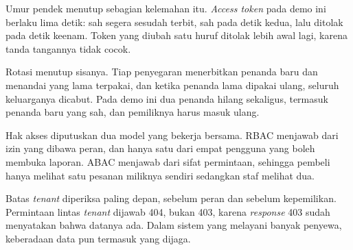 Umur pendek menutup sebagian kelemahan itu. \textit{Access token} pada demo
ini berlaku lima detik: sah segera sesudah terbit, sah pada detik kedua,
lalu ditolak pada detik keenam. Token yang diubah satu huruf ditolak lebih
awal lagi, karena tanda tangannya tidak cocok.

Rotasi menutup sisanya. Tiap penyegaran menerbitkan penanda baru dan
menandai yang lama terpakai, dan ketika penanda lama dipakai ulang, seluruh
keluarganya dicabut. Pada demo ini dua penanda hilang sekaligus, termasuk
penanda baru yang sah, dan pemiliknya harus masuk ulang.

Hak akses diputuskan dua model yang bekerja bersama. RBAC menjawab dari izin
yang dibawa peran, dan hanya satu dari empat pengguna yang boleh membuka
laporan. ABAC menjawab dari sifat permintaan, sehingga pembeli hanya melihat
satu pesanan miliknya sendiri sedangkan staf melihat dua.

Batas \textit{tenant} diperiksa paling depan, sebelum peran dan sebelum
kepemilikan. Permintaan lintas \textit{tenant} dijawab 404, bukan 403, karena
\textit{response} 403 sudah menyatakan bahwa datanya ada. Dalam sistem yang melayani
banyak penyewa, keberadaan data pun termasuk yang dijaga.
